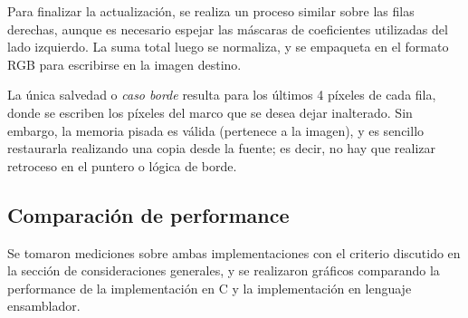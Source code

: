 Para finalizar la actualización, se realiza un proceso similar sobre las filas derechas, aunque es necesario espejar las máscaras de coeficientes utilizadas del lado izquierdo. La suma total luego se normaliza, y se empaqueta en el formato RGB para escribirse en la imagen destino.

La única salvedad o \emph{caso borde} resulta para los últimos 4 píxeles de cada fila, donde se escriben los píxeles del marco que se desea dejar inalterado. Sin embargo, la memoria pisada es válida (pertenece a la imagen), y es sencillo restaurarla realizando una copia desde la fuente; es decir, no hay que realizar retroceso en el puntero o lógica de borde.

\subsection{Comparación de performance}
\label{sub:comparaci_n_de_performance}

Se tomaron mediciones sobre ambas implementaciones con el criterio discutido en la sección de consideraciones generales, y se realizaron gráficos comparando la performance de la implementación en C y la implementación en lenguaje ensamblador.

